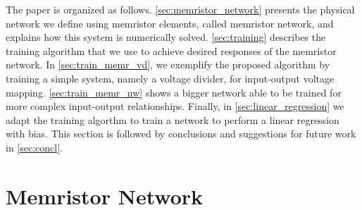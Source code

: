 \documentclass[reprint,superscriptaddress,prb,showkeys]{revtex4-2}
\begin{document}


The paper is organized as follows. \cref{sec:memristor_network} presents the physical network we define using memristor elements, called memristor network, and explains how this system is numerically solved. \cref{sec:training} describes the training algorithm that we use to achieve desired responses of the memristor network. In \cref{sec:train_memr_vd}, we exemplify the proposed algorithm by training a simple system, namely a voltage divider, for input-output voltage mapping. \cref{sec:train_memr_nw} shows a bigger network able to be trained for more complex input-output relationships. Finally, in \cref{sec:linear_regression} we adapt the training algorthm to train a network to perform a linear regression with bias. This section is followed by conclusions and suggestions for future work in \cref{sec:concl}.

\section{\label{sec:memristor_network}Memristor Network}
\end{document}
